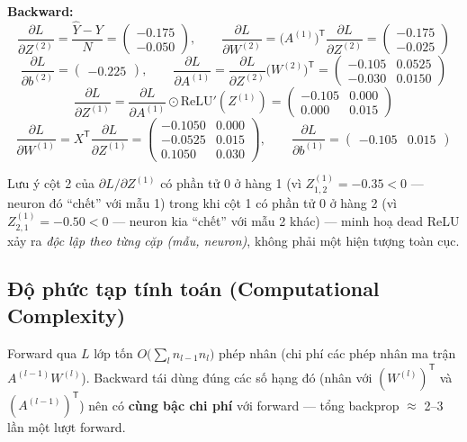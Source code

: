 \documentclass[12pt,a4paper]{article}
\newcommand{\T}{^{\mathsf{T}}}
\begin{document}
\textbf{Backward:}
$$\frac{\partial L}{\partial Z^{(2)}} = \frac{\hat Y-Y}{N} = \begin{pmatrix}-0.175\\ -0.050\end{pmatrix},\qquad
\frac{\partial L}{\partial W^{(2)}} = \big(A^{(1)}\big)\T\frac{\partial L}{\partial Z^{(2)}} = \begin{pmatrix}-0.175\\ -0.025\end{pmatrix}$$
$$\frac{\partial L}{\partial b^{(2)}} = \begin{pmatrix}-0.225\end{pmatrix},\qquad
\frac{\partial L}{\partial A^{(1)}} = \frac{\partial L}{\partial Z^{(2)}}\big(W^{(2)}\big)\T = \begin{pmatrix}-0.105 & 0.0525\\ -0.030 & 0.0150\end{pmatrix}$$
$$\frac{\partial L}{\partial Z^{(1)}} = \frac{\partial L}{\partial A^{(1)}}\odot\mathrm{ReLU}'(Z^{(1)}) = \begin{pmatrix}-0.105 & 0.000\\ 0.000 & 0.015\end{pmatrix}$$
$$\frac{\partial L}{\partial W^{(1)}} = X\T\frac{\partial L}{\partial Z^{(1)}} = \begin{pmatrix}-0.1050 & 0.000\\ -0.0525 & 0.015\\ 0.1050 & 0.030\end{pmatrix},\qquad
\frac{\partial L}{\partial b^{(1)}} = \begin{pmatrix}-0.105 & 0.015\end{pmatrix}$$

Lưu ý cột 2 của $\partial L/\partial Z^{(1)}$ có phần tử $0$ ở hàng 1 (vì
$Z^{(1)}_{1,2}=-0.35<0$ --- neuron đó ``chết'' với mẫu 1) trong khi cột 1
có phần tử $0$ ở hàng 2 (vì $Z^{(1)}_{2,1}=-0.50<0$ --- neuron kia
``chết'' với mẫu 2 khác) --- minh hoạ dead ReLU xảy ra \emph{độc lập theo
từng cặp (mẫu, neuron)}, không phải một hiện tượng toàn cục.

\subsection{Độ phức tạp tính toán (Computational Complexity)}
\label{sec:complexity}

Forward qua $L$ lớp tốn $O\!\big(\sum_l n_{l-1}n_l\big)$ phép nhân (chi phí
các phép nhân ma trận $A^{(l-1)}W^{(l)}$). Backward tái dùng đúng các số
hạng đó (nhân với $(W^{(l)})\T$ và $(A^{(l-1)})\T$) nên có \textbf{cùng bậc
chi phí} với forward --- tổng backprop $\approx$ 2--3 lần một lượt forward.
\end{document}
